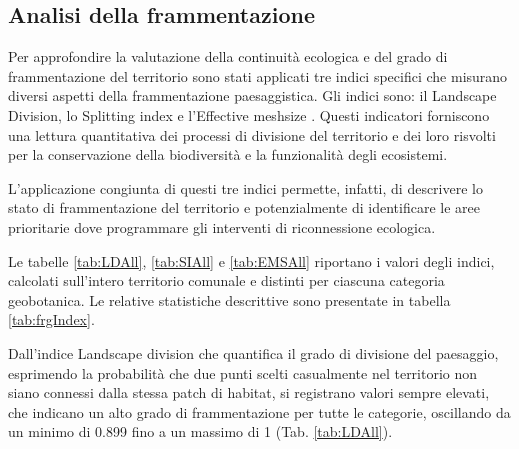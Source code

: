 \documentclass[
  a4paper,
]{book}
\begin{document}
\subsection{Analisi della frammentazione}\label{analisi-della-frammentazione-1}

Per approfondire la valutazione della continuità ecologica e del grado di frammentazione del territorio sono stati applicati tre indici specifici che misurano diversi aspetti della frammentazione paesaggistica.
Gli indici sono: il Landscape Division, lo Splitting index e l'Effective meshsize \citep{jaeger2000}.
Questi indicatori forniscono una lettura quantitativa dei processi di divisione del territorio e dei loro risvolti per la conservazione della biodiversità e la funzionalità degli ecosistemi.

L'applicazione congiunta di questi tre indici permette, infatti, di descrivere lo stato di frammentazione del territorio e potenzialmente di identificare le aree prioritarie dove programmare gli interventi di riconnessione ecologica.

Le tabelle \ref{tab:LDAll}, \ref{tab:SIAll} e \ref{tab:EMSAll} riportano i valori degli indici, calcolati sull'intero territorio comunale e distinti per ciascuna categoria geobotanica.
Le relative statistiche descrittive sono presentate in tabella \ref{tab:frgIndex}.

Dall'indice Landscape division che quantifica il grado di divisione del paesaggio, esprimendo la probabilità che due punti scelti casualmente nel territorio non siano connessi dalla stessa patch di habitat, si registrano valori sempre elevati, che indicano un alto grado di frammentazione per tutte le categorie, oscillando da un minimo di 0.899 fino a un massimo di 1 (Tab. \ref{tab:LDAll}).
\end{document}
